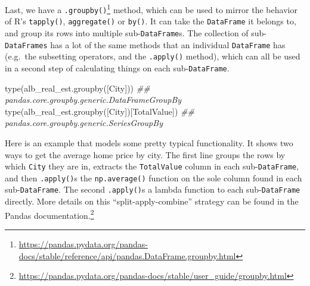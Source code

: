 \documentclass[
  12pt,
  krantz2]{krantz}
\makeatletter
\newenvironment{Shaded}{\begin{snugshade}}{\end{snugshade}}
\newcommand{\BuiltInTok}[1]{#1}
\newcommand{\CommentTok}[1]{\textcolor[rgb]{0.37,0.37,0.37}{\textit{#1}}}
\newcommand{\NormalTok}[1]{#1}
\newcommand{\StringTok}[1]{\textcolor[rgb]{0.5,0.5,0.5}{#1}}
\renewcommand{\href}[2]{#2\footnote{\url{#1}}}
\newenvironment{kframe}{%
\medskip{}
\setlength{\fboxsep}{.8em}
 \def\at@end@of@kframe{}%
 \ifinner\ifhmode%
  \def\at@end@of@kframe{\end{minipage}}%
  \begin{minipage}{\columnwidth}%
 \fi\fi%
 \def\FrameCommand##1{\hskip\@totalleftmargin \hskip-\fboxsep
 \colorbox{shadecolor}{##1}\hskip-\fboxsep
     \hskip-\linewidth \hskip-\@totalleftmargin \hskip\columnwidth}%
 \MakeFramed {\advance\hsize-\width
   \@totalleftmargin\z@ \linewidth\hsize
   \@setminipage}}%
 {\par\unskip\endMakeFramed%
 \at@end@of@kframe}
\renewenvironment{Shaded}{\begin{kframe}}{\end{kframe}}
\makeatother
\begin{document}
Last, we have a \href{https://pandas.pydata.org/pandas-docs/stable/reference/api/pandas.DataFrame.groupby.html}{\texttt{.groupby()}} method, which can be used to mirror the behavior of R's \texttt{tapply()}, \texttt{aggregate()} or \texttt{by()}. It can take the \texttt{DataFrame} it belongs to, and group its rows into multiple sub-\texttt{DataFrame}s. The collection of sub-\texttt{DataFrames} has a lot of the same methods that an individual \texttt{DataFrame} has (e.g.~the subsetting operators, and the \texttt{.apply()} method), which can all be used in a second step of calculating things on each sub-\texttt{DataFrame}.

\begin{Shaded}
\begin{Highlighting}[]
\BuiltInTok{type}\NormalTok{(alb\_real\_est.groupby([}\StringTok{\textquotesingle{}City\textquotesingle{}}\NormalTok{]))}
\CommentTok{\#\# pandas.core.groupby.generic.DataFrameGroupBy}
\BuiltInTok{type}\NormalTok{(alb\_real\_est.groupby([}\StringTok{\textquotesingle{}City\textquotesingle{}}\NormalTok{])[}\StringTok{\textquotesingle{}TotalValue\textquotesingle{}}\NormalTok{])}
\CommentTok{\#\# pandas.core.groupby.generic.SeriesGroupBy}
\end{Highlighting}
\end{Shaded}

Here is an example that models some pretty typical functionality. It shows two ways to get the average home price by city. The first line groups the rows by which \texttt{City} they are in, extracts the \texttt{TotalValue} column in each sub-\texttt{DataFrame}, and then \texttt{.apply()}s the \texttt{np.average()} function on the sole column found in each sub-\texttt{DataFrame}. The second \texttt{.apply()}s a lambda function to each sub-\texttt{DataFrame} directly. More details on this ``split-apply-combine'' strategy can be found in the \href{https://pandas.pydata.org/pandas-docs/stable/user_guide/groupby.html}{Pandas documentation.}
\end{document}

